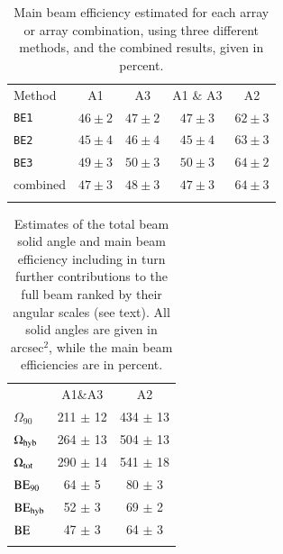 \documentclass[traditionalabstract]{aa}
\begin{document}
\begin{table}[!h]
  \caption[]{Main beam efficiency estimated for each array or array
  combination, using three different methods, and the combined
  results, given in percent.}
  \label{tab:beam_efficiency}
  \centering
  \begin{tabular}{l cccc}
    \hline\hline
    \noalign{\smallskip}
    Method & A1 &  A3 & A1 $\&$ A3 &  A2  \\
    \noalign{\smallskip}
    \hline
    \noalign{\smallskip}
    {\tt BE1}  &  $46 \pm 2$  & $47 \pm 2$  &  $47 \pm 3$  &  $62 \pm 3$  \\
    {\tt BE2}  &  $45 \pm 4$  & $46 \pm 4$  &  $45 \pm 4$  &  $63 \pm 3$  \\
    {\tt BE3}  &  $49 \pm 3$  & $50 \pm 3$  &  $50 \pm 3$  &  $64 \pm 2$  \\
    combined   &  $47 \pm 3$  & $48 \pm 3$  &  $47 \pm 3$  &  $64 \pm 3$  \\
    \noalign{\smallskip}
    \hline
  \end{tabular}
\end{table}
%
\begin{table}[!h]
\caption{Estimates of the total beam solid angle and main beam
efficiency including in turn further contributions to the full beam ranked by
their angular scales (see text). All solid angles are given in arcsec$^{2}$,
while the main beam efficiencies are in percent.}
\label{tab:solid_corr}
\centering
\begin{tabular}{lcc}
\hline\hline
\noalign{\smallskip}
&  A1\&A3 & A2 \\
\noalign{\smallskip}
\hline
\noalign{\smallskip}
$\Omega_{90}$        &    211 $\pm$  12 & 434 $\pm$ 13 \\\noalign{\smallskip}
$\Omega_{\rm{hyb}}$   &    264 $\pm$  13 & 504 $\pm$ 13  \\\noalign{\smallskip}
$\Omega_{\rm{tot}}$   &    290 $\pm$  14 & 541 $\pm$ 18  \\\noalign{\smallskip}
\noalign{\smallskip}
\hline
\noalign{\smallskip}
$\rm{BE}_{90}$       &   64 $\pm$ 5  &  80 $\pm$ 3  \\\noalign{\smallskip}
$\rm{BE}_{\rm{hyb}}$  &   52 $\pm$ 3  &  69 $\pm$ 2  \\\noalign{\smallskip}
$\rm{BE}$            &  47  $\pm$ 3  &  64 $\pm$ 3  \\\noalign{\smallskip}
\noalign{\smallskip}
\hline
\label{tab:solid_corr}
\end{tabular}
\end{table}
%
\end{document}
